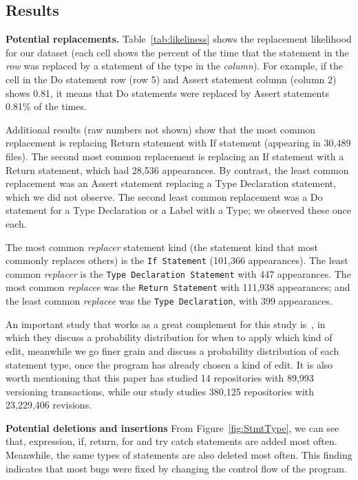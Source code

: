 \documentclass{sig-alternate-05-2015}
\begin{document}
\subsection{Results}

\noindent\textbf{Potential replacements.} Table~\ref{tab:likeliness} shows
the replacement likelihood for our dataset 
(each cell shows the percent of the time that the statement in the \emph{row}
was replaced by a statement of the type in the \emph{column}). For example, if
the cell in the Do statement row (row 5) and Assert statement column (column 2)
shows 0.81, it means that Do statements were
replaced by Assert statements 0.81\% of the times.

Additional results (raw numbers not shown) show that the most common replacement
is replacing Return statement with If statement (appearing in 30,489 files). The
second most common replacement is replacing an If statement with a Return
statement, which had 28,536 appearances. 
By contrast, the least common replacement was an Assert
statement replacing a Type Declaration statement, which we did not observe. 
The second least common replacement was a Do statement for a Type
Declaration or a Label with a Type; we observed these once each.  

The most common
\emph{replacer} statement kind (the statement kind that most commonly replaces
others) is the \texttt{If Statement} (101,366 appearances). The least
common \emph{replacer} is the \texttt{Type Declaration Statement} with 447
appearances.
The most common \emph{replacee} was the
\texttt{Return Statement} with 111,938 appearances; and the least common
\emph{replacee} was the \texttt{Type Declaration}, with 399 appearances.

An important study that works as a great complement for this study is~\cite{martinez2013}, in which they discuss a probability distribution for when to apply which kind of edit, meanwhile we go finer grain and discuss a probability distribution of each statement type, once the program has already chosen a kind of edit. It is also worth mentioning that this paper has studied 14 repositories with 89,993 versioning transactions, while our study studies 380,125 repositories with 23,229,406 revisions. 

\vspace{1ex}
\noindent \textbf{Potential deletions and insertions} From Figure~\ref{fig:StmtType}, we
can see that, expression, if, return, for and try catch statements are added
most often. Meanwhile, the same types of statements are also deleted most
often. This finding indicates that most bugs were fixed by changing the control
flow of the program.
\end{document}
